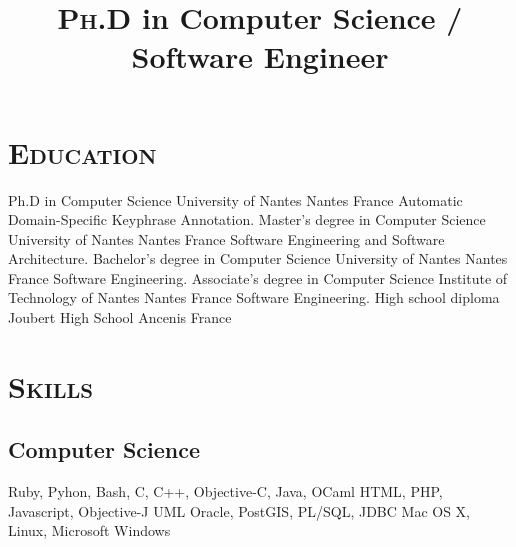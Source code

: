 \documentclass[10pt, a4paper]{moderncv}
\title{\Large{\textsc{Ph.D}} \large{in Computer Science / Software Engineer}}
\begin{document}
  \maketitle

  \section{\textsc{Education}}
            {Ph.D in Computer Science}                        %
            {University of Nantes}                            %
            {Nantes}                                          %
            {France}                                          %
            {Automatic Domain-Specific Keyphrase Annotation.} %
            {Master's degree in Computer Science}
            {University of Nantes}
            {Nantes}
            {France}
            {Software Engineering and Software Architecture.}
            {Bachelor's degree in Computer Science}
            {University of Nantes}
            {Nantes}
            {France}
            {Software Engineering.}
            {Associate's degree in Computer Science}
            {Institute of Technology of Nantes}
            {Nantes}
            {France}
            {Software Engineering.}
            {High school diploma}
            {Joubert High School}
            {Ancenis}
            {France}
            {}

  \section{\textsc{Skills}}
    \subsection{Computer Science}
             {Ruby, Pyhon, Bash, C, C++, Objective-C, Java, OCaml}
             {HTML, PHP, Javascript, Objective-J}
             {UML}
             {Oracle, PostGIS, PL/SQL, JDBC}
             {Mac OS X, Linux, Microsoft Windows}
\end{document}
